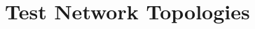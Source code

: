 \documentclass[t,handout]{beamer}
\begin{document}
%

\section{Test Network Topologies}
\end{document}
